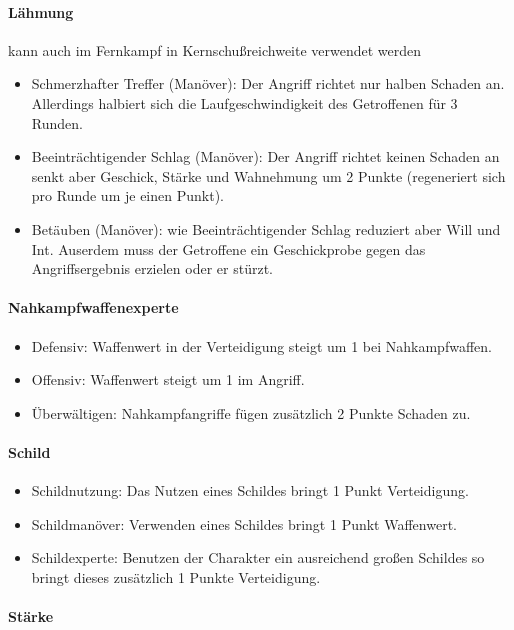 \documentclass{article}
\begin{document}
\paragraph{Lähmung }
kann auch im Fernkampf in Kernschußreichweite verwendet werden

\begin{itemize}
\item Schmerzhafter Treffer (Manöver): Der Angriff richtet nur halben Schaden an. Allerdings halbiert sich die Laufgeschwindigkeit des Getroffenen für 3 Runden.
\item Beeinträchtigender Schlag (Manöver): Der Angriff richtet keinen Schaden an senkt aber Geschick, Stärke und Wahnehmung um 2 Punkte (regeneriert sich pro Runde um je einen Punkt).
\item Betäuben (Manöver): wie Beeinträchtigender Schlag reduziert aber Will und Int. Auserdem muss der Getroffene ein Geschickprobe gegen das Angriffsergebnis erzielen oder er stürzt.
\end{itemize}

\paragraph{Nahkampfwaffenexperte}

\begin{itemize}
\item Defensiv: Waffenwert in der Verteidigung steigt um 1 bei Nahkampfwaffen.
\item Offensiv: Waffenwert steigt um 1 im Angriff.
\item Überwältigen: Nahkampfangriffe fügen zusätzlich 2 Punkte Schaden zu.
\end{itemize}

\paragraph{Schild}

\begin{itemize}
\item Schildnutzung: Das Nutzen eines Schildes bringt 1 Punkt Verteidigung.
\item Schildmanöver: Verwenden eines Schildes bringt 1 Punkt Waffenwert.
\item Schildexperte: Benutzen der Charakter ein ausreichend großen Schildes so bringt dieses zusätzlich 1 Punkte Verteidigung.
\end{itemize}

\paragraph{Stärke}
\end{document}
